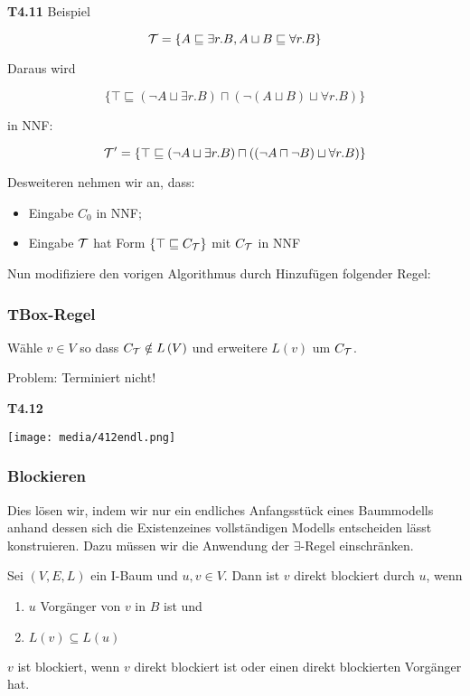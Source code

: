 \textbf{T4.11} Beispiel

$$\mathcal{T} = \{A \sqsubseteq \exists r.B, A \sqcup B \sqsubseteq \forall r.B\}$$

Daraus wird

$$\{\top \sqsubseteq (\neg A \sqcup \exists r.B) \sqcap (\neg (A \sqcup B) \sqcup \forall r.B)\}$$

in NNF:

$$\mathcal{T}' = \{\top \sqsubseteq (\neg A \sqcup \exists r.B) \sqcap ((\neg A \sqcap \neg B) \sqcup \forall r.B)\}$$

Desweiteren nehmen wir an, dass:

\begin{itemize}
	\item Eingabe $C_0$ in NNF;
	\item Eingabe $\mathcal{T}$ hat Form $\{\top \sqsubseteq C_{\mathcal{T}}\}$ mit $C_{\mathcal{T}}$ in NNF
\end{itemize}

Nun modifiziere den vorigen Algorithmus durch Hinzufügen folgender Regel:

\subsubsection{TBox-Regel}\label{tbox-regel}

Wähle $v \in V$ so dass $C_{\mathcal{T}} \notin L\left( V \right)$ und
erweitere $L\left( v \right)$ um $C_{\mathcal{T}}$.

Problem: Terminiert nicht!

\textbf{T4.12}

\texttt{[image: media/412endl.png]}

\subsubsection{Blockieren}\label{blockieren}

Dies lösen wir, indem wir nur ein endliches Anfangsstück eines Baummodells anhand dessen sich die Existenzeines vollständigen Modells entscheiden lässt konstruieren. Dazu müssen wir die Anwendung der $\exists$-Regel einschränken.

\begin{definition}[Blockiert]

Sei $\left( V,E,L \right)$ ein I-Baum und $u,v \in V$. Dann ist
$v$ direkt blockiert durch $u$, wenn

\begin{enumerate}
\def\labelenumi{\arabic{enumi}.}
\item
  $u$ Vorgänger von $v$ in $B$ ist und
\item
  $L\left( v \right) \subseteq L\left( u \right)$
\end{enumerate}

$v$ ist blockiert, wenn $v$ direkt blockiert ist oder einen direkt
blockierten Vorgänger hat.
\end{definition}

